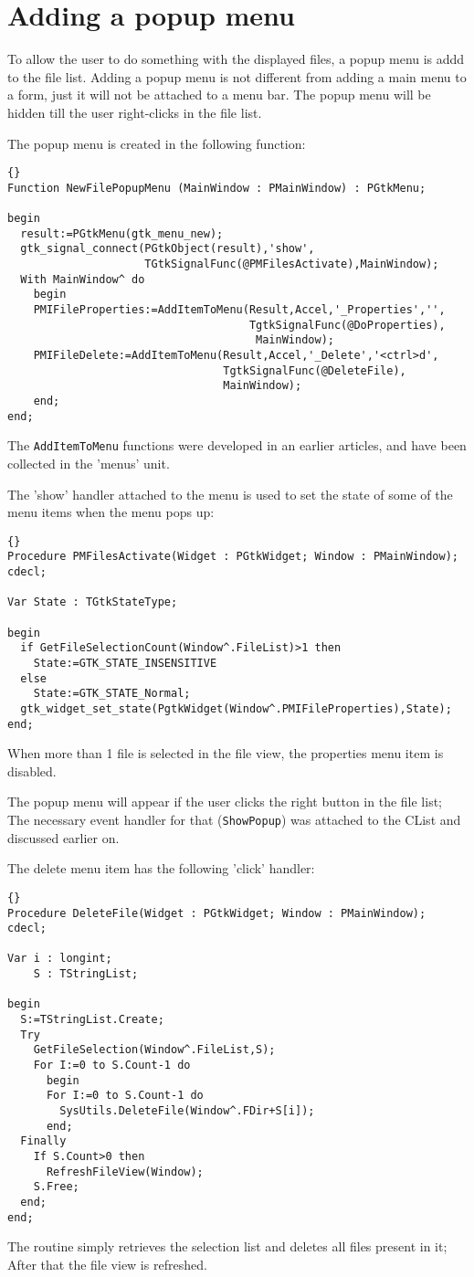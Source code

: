 \documentclass[10pt]{article}
\begin{document}
\section{Adding a popup menu}
To allow the user to do something with the displayed files, a popup menu is
addd to the file list. Adding a popup menu is not different from adding a 
main menu to a form, just it will not be attached to a menu bar. The popup
menu will be hidden till the user right-clicks in the file list.

The popup menu is created in the following function:
\begin{lstlisting}{}
Function NewFilePopupMenu (MainWindow : PMainWindow) : PGtkMenu;

begin
  result:=PGtkMenu(gtk_menu_new);
  gtk_signal_connect(PGtkObject(result),'show',
                     TGtkSignalFunc(@PMFilesActivate),MainWindow);
  With MainWindow^ do
    begin
    PMIFileProperties:=AddItemToMenu(Result,Accel,'_Properties','',
                                     TgtkSignalFunc(@DoProperties),
                                      MainWindow);
    PMIFileDelete:=AddItemToMenu(Result,Accel,'_Delete','<ctrl>d',
                                 TgtkSignalFunc(@DeleteFile),
                                 MainWindow);
    end; 
end;
\end{lstlisting}
The \lstinline|AddItemToMenu| functions were developed in an earlier
articles, and have been collected in the 'menus' unit. 

The 'show' handler attached to the menu is used to set the state
of some of the menu items when the menu pops up:
\begin{lstlisting}{}
Procedure PMFilesActivate(Widget : PGtkWidget; Window : PMainWindow); cdecl;

Var State : TGtkStateType;

begin
  if GetFileSelectionCount(Window^.FileList)>1 then
    State:=GTK_STATE_INSENSITIVE
  else
    State:=GTK_STATE_Normal;
  gtk_widget_set_state(PgtkWidget(Window^.PMIFileProperties),State);
end;
\end{lstlisting}
When more than 1 file is selected in the file view, the properties menu item
is disabled. 

The popup menu will appear if the user clicks the right button in the file
list; The necessary event handler for that (\lstinline|ShowPopup|) was 
attached to the CList and discussed earlier on.

The delete menu item has the following 'click' handler:
\begin{lstlisting}{}
Procedure DeleteFile(Widget : PGtkWidget; Window : PMainWindow); cdecl;

Var i : longint;
    S : TStringList;
    
begin
  S:=TStringList.Create;
  Try
    GetFileSelection(Window^.FileList,S);
    For I:=0 to S.Count-1 do
      begin
      For I:=0 to S.Count-1 do
        SysUtils.DeleteFile(Window^.FDir+S[i]);
      end;
  Finally
    If S.Count>0 then
      RefreshFileView(Window);
    S.Free;
  end;        
end;
\end{lstlisting}
The routine simply retrieves the selection list and deletes all files
present in it; After that the file view is refreshed.
\end{document}
